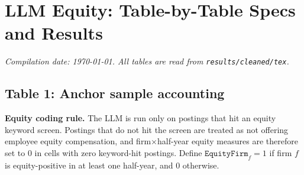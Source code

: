 \documentclass{article}
\newcommand{\cleanedresultsdir}{../../results/cleaned/tex}
\newcommand{\TableInput}[2][\linewidth]{}
\newcommand{\FloatNote}[1]{%
  \begingroup
    \captionsetup{style=noteflush}%
    \caption*{\textit{Notes:}~#1}%
  \endgroup
}
\begin{document}
\section*{LLM Equity: Table-by-Table Specs and Results}

\noindent\textit{Compilation date: \today. All tables are read from \texttt{results/cleaned/tex}.}

\subsection*{Table 1: Anchor sample accounting}
\noindent \textbf{Equity coding rule.} The LLM is run only on postings that hit an equity keyword screen. Postings that do not hit the screen are treated as not offering employee equity compensation, and firm$\times$half-year equity measures are therefore set to 0 in cells with zero keyword-hit postings. Define $\texttt{EquityFirm}_f=1$ if firm $f$ is equity-positive in at least one half-year, and 0 otherwise.
\begin{table}[H]\centering
  \caption{Anchor sample accounting}
  \TableInput{\cleanedresultsdir/llm_equity_pi_followups_anchor_sample.tex}
  \FloatNote{This is a two-column accounting table. The left column lists a \emph{metric} and the right column lists the corresponding \emph{value}. ``Firm$\times$half-year rows'' is the number of firm$\times$half-year observations in the firm panel used for the firm-level regressions in this note (Tables 3, 5, and 7). ``Firms'' is the number of unique firms in that panel. ``Startup firms'' and ``Non-startup firms'' split the unique-firm count by the baseline startup indicator (startup is defined as firm age $\leq 10$ as of 2020 in the baseline firm panel). ``Firms with any equity signal'' counts unique firms with $\texttt{EquityFirm}_f=1$ under the coding rule stated above.}
\end{table}
\end{document}
